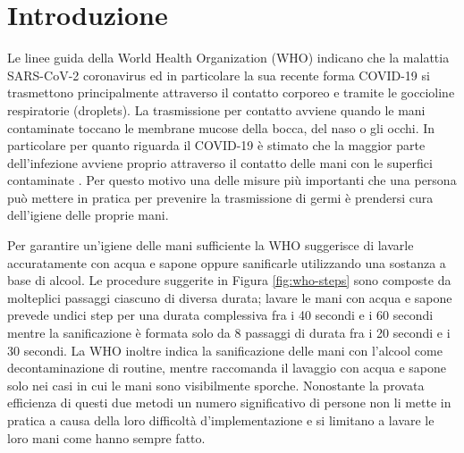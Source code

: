 \chapter{Introduzione}
\label{cap:introduzione}

Le linee guida della World Health Organization (WHO) indicano che la malattia SARS-CoV-2 coronavirus ed in particolare la sua recente forma COVID-19 si trasmettono principalmente 
attraverso il contatto corporeo e tramite le goccioline respiratorie (droplets). La trasmissione per contatto avviene quando le mani contaminate toccano le membrane 
mucose della bocca, del naso o gli occhi. In particolare per quanto riguarda il COVID-19 è stimato che la maggior parte dell'infezione avviene proprio attraverso il contatto 
delle mani con le superfici contaminate \cite{santarpia2020aerosol}. Per questo motivo una delle misure più importanti che una persona può mettere in pratica per prevenire la trasmissione di germi 
è prendersi cura dell'igiene delle proprie mani.

Per garantire un'igiene delle mani sufficiente la WHO suggerisce di lavarle accuratamente con acqua e sapone oppure sanificarle utilizzando una sostanza a base di alcool.
Le procedure suggerite in Figura \ref{fig:who-steps} sono composte da molteplici passaggi ciascuno di diversa durata; lavare le mani con acqua e sapone prevede undici step per una durata complessiva fra 
i 40 secondi e i 60 secondi mentre la sanificazione è formata solo da 8 passaggi di durata fra i 20 secondi e i 30 secondi. 
La WHO inoltre indica la sanificazione delle mani con l'alcool come decontaminazione di routine, mentre raccomanda il lavaggio con acqua e sapone solo nei casi in cui le mani sono visibilmente sporche.
Nonostante la provata efficienza di questi due metodi un numero significativo di persone non li mette in pratica a causa della loro difficoltà d'implementazione e si limitano 
a lavare le loro mani come hanno sempre fatto.

